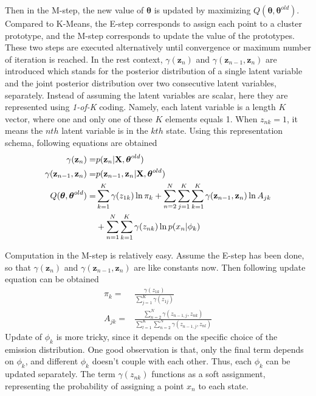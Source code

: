 Then in the M-step,  the new value of \(\boldsymbol{\theta}\) is updated by maximizing \(Q(\boldsymbol{\theta}, \boldsymbol{\theta}^{old})\). Compared to K-Means, the E-step corresponds to assign each point to a cluster prototype, and the M-step corresponds to update the value of the prototypes. These two steps are executed alternatively until convergence or maximum number of iteration is reached. In the rest context, \(\gamma(\mathbf{z}_n)\) and \(\gamma(\mathbf{z}_{n-1}, \mathbf{z}_n)\) are introduced which stands for the posterior distribution of a single latent variable and the joint posterior distribution over two consecutive latent variables, separately. Instead of assuming the latent variables are scalar, here they are represented using \textit{1-of-K} coding. Namely, each latent variable is a length \(K\) vector, where one and only one of these \(K\) elements equals 1. When \(z_{nk} = 1\), it means the \(nth\) latent variable is in the \(kth\) state. Using this representation schema, following equations are obtained
\begin{align}
	\gamma(\mathbf{z}_n) = &p(\mathbf{z}_n | \mathbf{X}, \boldsymbol{\theta}^{old})	\\
	\gamma(\mathbf{z}_{n-1}, \mathbf{z}_n) = &p(\mathbf{z}_{n-1}, \mathbf{z}_n | \mathbf{X}, \boldsymbol{\theta}^{old}) \\
	Q(\boldsymbol{\theta}, \boldsymbol{\theta}^{old}) = &\sum_{k=1}^{K} \gamma(z_{1k})\ln \pi_k + \sum_{n=2}^{N}\sum_{j=1}^{K}\sum_{k=1}^{K}\gamma(\mathbf{z}_{n-1}, \mathbf{z}_n)\ln A_{jk}		\notag		\\
		&+ \sum_{n=1}^{N}\sum_{k=1}^{K}\gamma(z_{nk})\ln p(x_n|\phi_k)	
\end{align}

Computation in the M-step is relatively easy. Assume the E-step has been done, so that  \(\gamma(\mathbf{z}_n)\) and \(\gamma(\mathbf{z}_{n-1}, \mathbf{z}_n)\) are like constants now. Then following update equation can be obtained
\begin{align}
	\pi_k = & \frac{\gamma(z_{1k})}{\sum_{j=1}^{K}\gamma(z_{1j})}	\\
	A_{jk} = & \frac{\sum_{n=2}^{N}\gamma(z_{n-1,j},z_{nk})}{\sum_{l=1}^{K}\sum_{n=2}^{N}\gamma(z_{n-1,j},z_{nl})}
\end{align}
Update of \(\phi_k\) is more tricky, since it depends on the specific choice of the emission distribution. One good observation is that, only the final term depends on \(\phi_k\), and different \(\phi_k\) doesn't couple with each other. Thus, each \(\phi_k\) can be updated separately. The term \(\gamma(z_{nk})\) functions as a soft assignment, representing the probability of assigning a point \(x_n\) to each state.

